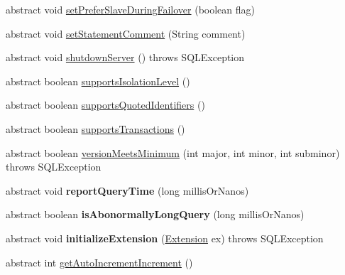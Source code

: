 \begin{DoxyCompactItemize}
\item 
abstract void \mbox{\hyperlink{interfacecom_1_1mysql_1_1jdbc_1_1_connection_af8c0ed78ccafd6088266b19481b85ce6}{set\+Prefer\+Slave\+During\+Failover}} (boolean flag)
\item 
abstract void \mbox{\hyperlink{interfacecom_1_1mysql_1_1jdbc_1_1_connection_a94f38f8f7d8afd2a7bf6c87ad0d5d422}{set\+Statement\+Comment}} (String comment)
\item 
abstract void \mbox{\hyperlink{interfacecom_1_1mysql_1_1jdbc_1_1_connection_a58ca482a0546e93af285d0e9836d7fae}{shutdown\+Server}} ()  throws S\+Q\+L\+Exception
\item 
abstract boolean \mbox{\hyperlink{interfacecom_1_1mysql_1_1jdbc_1_1_connection_aea32f547f2d12d07de7792a6cdb20585}{supports\+Isolation\+Level}} ()
\item 
abstract boolean \mbox{\hyperlink{interfacecom_1_1mysql_1_1jdbc_1_1_connection_a16e68907781a09083ff1afda25dff502}{supports\+Quoted\+Identifiers}} ()
\item 
abstract boolean \mbox{\hyperlink{interfacecom_1_1mysql_1_1jdbc_1_1_connection_a730de8090ab7cf2acfbcb2fefbd84ea2}{supports\+Transactions}} ()
\item 
abstract boolean \mbox{\hyperlink{interfacecom_1_1mysql_1_1jdbc_1_1_connection_af05f0b2545de1a6a1ca7d41f467516d3}{version\+Meets\+Minimum}} (int major, int minor, int subminor)  throws S\+Q\+L\+Exception
\item 
\mbox{\label{interfacecom_1_1mysql_1_1jdbc_1_1_connection_a7008e3a7f4d8899f6be067d3aca53d9c}} 
abstract void {\bfseries report\+Query\+Time} (long millis\+Or\+Nanos)
\item 
\mbox{\label{interfacecom_1_1mysql_1_1jdbc_1_1_connection_a499c7c139d4ed837b94f3f70e6779c03}} 
abstract boolean {\bfseries is\+Abonormally\+Long\+Query} (long millis\+Or\+Nanos)
\item 
\mbox{\label{interfacecom_1_1mysql_1_1jdbc_1_1_connection_a1f6d6b2a2ee5b5866747c911fc818c14}} 
abstract void {\bfseries initialize\+Extension} (\mbox{\hyperlink{interfacecom_1_1mysql_1_1jdbc_1_1_extension}{Extension}} ex)  throws S\+Q\+L\+Exception
\item 
abstract int \mbox{\hyperlink{interfacecom_1_1mysql_1_1jdbc_1_1_connection_ab681fd9ce4ce7b52529c0bea9134fc7c}{get\+Auto\+Increment\+Increment}} ()

\end{DoxyCompactItemize}
